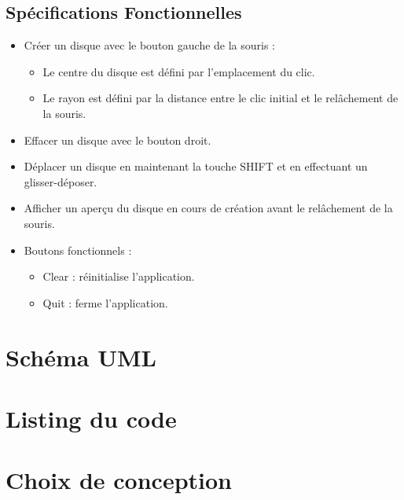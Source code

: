 \documentclass[12pt]{report}
\begin{document}
    \subsection*{Spécifications Fonctionnelles}
    \begin{itemize}
        \item Créer un disque avec le bouton gauche de la souris :
        \begin{itemize}
            \item Le centre du disque est défini par l'emplacement du clic.
            \item Le rayon est défini par la distance entre le clic initial et le relâchement de la souris.
        \end{itemize}
        \item Effacer un disque avec le bouton droit.
        \item Déplacer un disque en maintenant la touche SHIFT et en effectuant un glisser-déposer.
        \item Afficher un aperçu du disque en cours de création avant le relâchement de la souris.
        \item Boutons fonctionnels :
        \begin{itemize}
            \item Clear : réinitialise l'application.
            \item Quit : ferme l'application.
        \end{itemize}
    \end{itemize}

    \section*{Schéma UML}

    \section*{Listing du code}
    

    \section*{Choix de conception}
\end{document}
